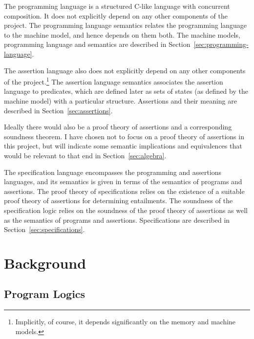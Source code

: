 \documentclass[11pt]{report}
\begin{document}
The programming language is a structured C-like language with concurrent composition. It does not explicitly depend on any other components of the project. The programming language semantics relates the programming language to the machine model, and hence depends on them both. The machine models, programming language and semantics are described in Section~\ref{sec:programming-language}. 

The assertion language also does not explicitly depend on any other components of the project.\footnote{Implicitly, of course, it depends significantly on the memory and machine models.} The assertion language semantics associates the assertion language to predicates, which are defined later as sets of states (as defined by the machine model) with a particular structure. Assertions and their meaning are described in Section~\ref{sec:assertions}. 

Ideally there would also be a proof theory of assertions and a corresponding soundness theorem. I have chosen not to focus on a proof theory of assertions in this project, but will indicate some semantic implications and equivalences that would be relevant to that end in Section~\ref{sec:algebra}.

The specification language encompasses the programming and assertions languages, and its semantics is given in terms of the semantics of programs and assertions. The proof theory of specifications relies on the existence of a suitable proof theory of assertions for determining entailments. The soundness of the specification logic relies on the soundness of the proof theory of assertions as well as the semantics of programs and assertions. Specifications are described in Section~\ref{sec:specifications}.

\chapter{Background}

\section{Program Logics}
\label{sec:program-logics}
\end{document}
